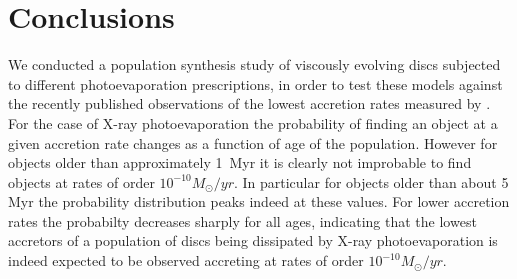 \documentclass[fleqn,usenatbib]{mnras}
\begin{document}




\section{Conclusions}\label{sec:conclusions}

We conducted a population synthesis study of viscously evolving discs subjected to different photoevaporation prescriptions, in order to test these models against the recently published observations of the lowest accretion rates measured by . For the case of X-ray photoevaporation the probability of finding an object at a given accretion rate changes as a function of age of the population. However for objects older than approximately 1~Myr it is clearly not improbable to find objects at rates of order $10^{-10}M_{\odot}/yr$. In particular for objects older than about 5 Myr the probability distribution peaks indeed at these values. For lower accretion rates the probabilty decreases sharply for all ages, indicating that the lowest accretors of a population of discs being dissipated by X-ray photoevaporation is indeed expected to be observed accreting at rates of order $10^{-10} M_{\odot}/yr$. 
\end{document}

